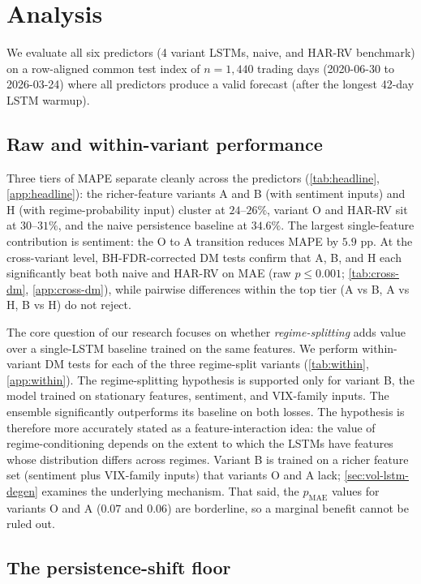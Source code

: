 \documentclass{article}
\begin{document}
\section{Analysis}
\label{sec:analysis}

We evaluate all six predictors (4 variant LSTMs, naive, and HAR-RV benchmark) on a row-aligned common test index of $n = 1{,}440$ trading days (2020-06-30 to 2026-03-24) where all predictors produce a valid forecast (after the longest 42-day LSTM warmup).

\subsection{Raw and within-variant performance}

Three tiers of MAPE separate cleanly across the predictors (\cref{tab:headline}, \cref{app:headline}): the richer-feature variants A and B (with sentiment inputs) and H (with regime-probability input) cluster at $24$--$26\%$, variant O and HAR-RV sit at $30$--$31\%$, and the naive persistence baseline at $34.6\%$. The largest single-feature contribution is sentiment: the O to A transition reduces MAPE by $5.9$ pp. At the cross-variant level, BH-FDR-corrected DM tests confirm that A, B, and H each significantly beat both naive and HAR-RV on MAE (raw $p \le 0.001$; \cref{tab:cross-dm}, \cref{app:cross-dm}), while pairwise differences within the top tier (A vs B, A vs H, B vs H) do not reject.

The core question of our research focuses on whether \emph{regime-splitting} adds value over a single-LSTM baseline trained on the same features. We perform within-variant DM tests for each of the three regime-split variants (\cref{tab:within}, \cref{app:within}). The regime-splitting hypothesis is supported only for variant B, the model trained on stationary features, sentiment, and VIX-family inputs. The ensemble significantly outperforms its baseline on both losses. The hypothesis is therefore more accurately stated as a feature-interaction idea: the value of regime-conditioning depends on the extent to which the LSTMs have features whose distribution differs across regimes. Variant B is trained on a richer feature set (sentiment plus VIX-family inputs) that variants O and A lack; \cref{sec:vol-lstm-degen} examines the underlying mechanism. That said, the $p_{\mathrm{MAE}}$ values for variants O and A ($0.07$ and $0.06$) are borderline, so a marginal benefit cannot be ruled out.

\subsection{The persistence-shift floor}
\label{sec:persistence-shift}
\end{document}

